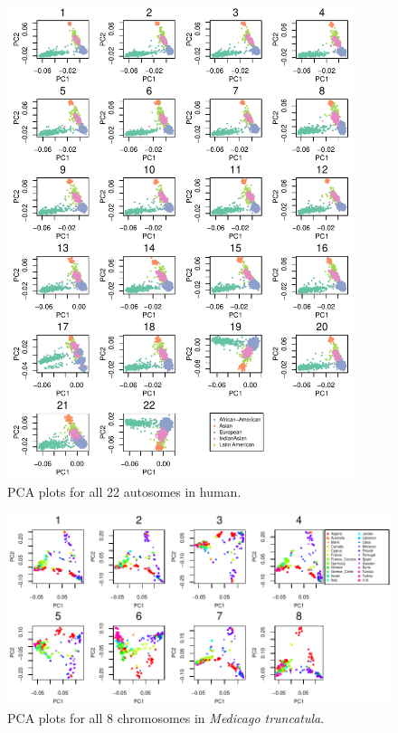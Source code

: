 \documentclass[11pt, oneside]{article}   	%
\begin{document}
\begin{figure}
    \begin{center}
       \includegraphics[width=0.9\textwidth]{FigS_pca_plot_allchr_human}
    \end{center}
    \caption{
        PCA plots for all 22 autosomes in human.
        \label{fig:pca_human_allchr}
    }
\end{figure}

\begin{figure}
    \begin{center}
       \includegraphics[width=1\textwidth]{FigS_pca_plots_medicago_allchr}
    \end{center}
    \caption{
        PCA plots for all 8 chromosomes in \textit{Medicago truncatula}.
        \label{fig:pca_medicago_allchr}
    }
\end{figure}
\end{document}
